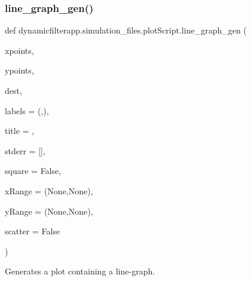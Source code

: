\subsubsection{\texorpdfstring{line\_graph\_gen()}{line\_graph\_gen()}}
{\footnotesize\ttfamily def dynamicfilterapp.\+simulation\+\_\+files.\+plot\+Script.\+line\+\_\+graph\+\_\+gen (\begin{DoxyParamCaption}\item[{}]{xpoints,  }\item[{}]{ypoints,  }\item[{}]{dest,  }\item[{}]{labels = {\ttfamily (\textquotesingle{}\textquotesingle{},\textquotesingle{}\textquotesingle{})},  }\item[{}]{title = {\ttfamily \textquotesingle{}\textquotesingle{}},  }\item[{}]{stderr = {\ttfamily \mbox{[}\mbox{]}},  }\item[{}]{square = {\ttfamily False},  }\item[{}]{x\+Range = {\ttfamily (None,None)},  }\item[{}]{y\+Range = {\ttfamily (None,None)},  }\item[{}]{scatter = {\ttfamily False} }\end{DoxyParamCaption})}



Generates a plot containing a line-\/graph. 


